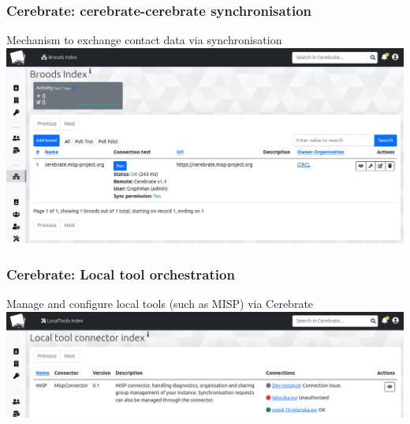 \begin{frame}
    \frametitle{Cerebrate: cerebrate-cerebrate synchronisation}
    Mechanism to exchange contact data via synchronisation
    \includegraphics[width=1.0\linewidth]{pictures/cerebrate-brood.png}
\end{frame}

\begin{frame}
    \frametitle{Cerebrate: Local tool orchestration}
    Manage and configure local tools (such as MISP) via Cerebrate
    \includegraphics[width=1.0\linewidth]{pictures/cerebrate-lt.png}
\end{frame}

